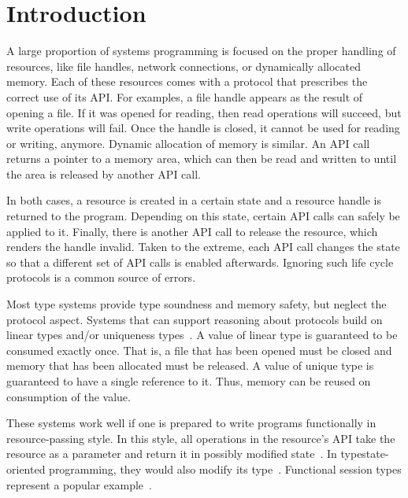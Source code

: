 \section{Introduction}

A large proportion of systems programming is focused on the proper
handling of resources, like file handles, network connections, or
dynamically allocated memory. Each of these resources comes with a
protocol that prescribes the correct use of its API.
For examples, a file handle appears as the result of opening a
file. If it was opened for reading, then read operations will succeed,
but write operations will fail. Once the handle is closed, it cannot
be used for reading or writing, anymore.
%
Dynamic allocation of memory is similar. An API call returns a
pointer to a memory area, which can then be read and written to until
the area is released by another API call.

In both cases, a resource is created in a certain state and a resource
handle is returned to the program. Depending on this state, certain API calls
can safely be applied to it. Finally, there is another API call to
release the resource, which renders the handle invalid.
Taken to the extreme, each API call changes the state so that a
different set of API calls is enabled afterwards.
Ignoring such life cycle protocols is a common source of errors.


Most type systems provide type soundness and memory safety, but neglect the
protocol aspect. Systems that can support reasoning about protocols
build on linear types \cite{DBLP:journals/tcs/Girard87} and/or 
uniqueness types~\cite{DBLP:conf/plilp/BarendsenS95}. A value of linear
type is guaranteed to be consumed
exactly once. That is, a file that has been opened must be closed and
memory that has been allocated must be released. A value of unique
type is guaranteed to have a single reference to it. Thus, memory can
be reused on consumption of the value. 

These systems work well if one is prepared to write programs
functionally in resource-passing style. In this style, all operations
in the resource's API take the resource as a parameter and return it
in possibly modified state~\cite{DBLP:journals/jfp/AchtenP95}. In
typestate-oriented programming, they would also modify its
type~\cite{DBLP:conf/oopsla/AldrichSSS09}. Functional session types
represent a popular
example~\cite{DBLP:journals/jfp/GayV10,lindley17:_light_funct_session_types}. 

